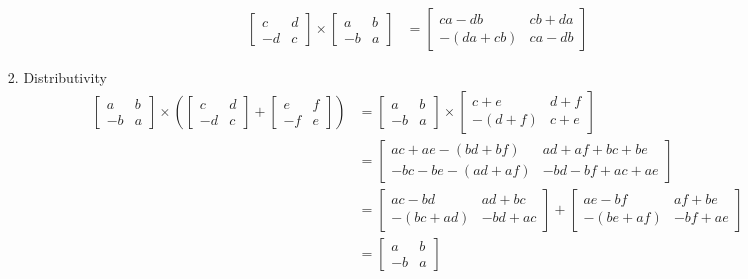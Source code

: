 \documentclass[letterpaper]{article}
\begin{document}
\begin{enumerate}
\begin{enumerate}
\begin{enumerate}
\begin{align*}
        \left[\begin{array}{rr}c&d\\-d&c\end{array}\right]
        \times\left[\begin{array}{rr}a&b\\-b&a\end{array}\right]
        &=\left[\begin{array}{rr}ca-db&cb+da\\-(da+cb)&ca-db\end{array}\right]
      \end{align*}
    \item
      Distributivity
      \begin{align*}
        \left[\begin{array}{rr}a&b\\-b&a\end{array}\right]
        \times\left(\left[\begin{array}{rr}c&d\\-d&c\end{array}\right]
        +\left[\begin{array}{rr}e&f\\-f&e\end{array}\right]\right)
        &=\left[\begin{array}{rr}a&b\\-b&a\end{array}\right]
        \times\left[\begin{array}{rr}c+e&d+f\\-(d+f)&c+e\end{array}\right]\\
        &=\left[\begin{array}{rr}ac+ae-(bd+bf)&ad+af+bc+be\\-bc-be-(ad+af)&-bd-bf+ac+ae\end{array}\right]\\
        &=\left[\begin{array}{rr}ac-bd&ad+bc\\-(bc+ad)&-bd+ac\end{array}\right]+
        \left[\begin{array}{rr}ae-bf&af+be\\-(be+af)&-bf+ae\end{array}\right]\\
        &=\left[\begin{array}{rr}a&b\\-b&a\end{array}\right]

\end{align*}
\end{enumerate}
\end{enumerate}
\end{enumerate}
\end{document}
